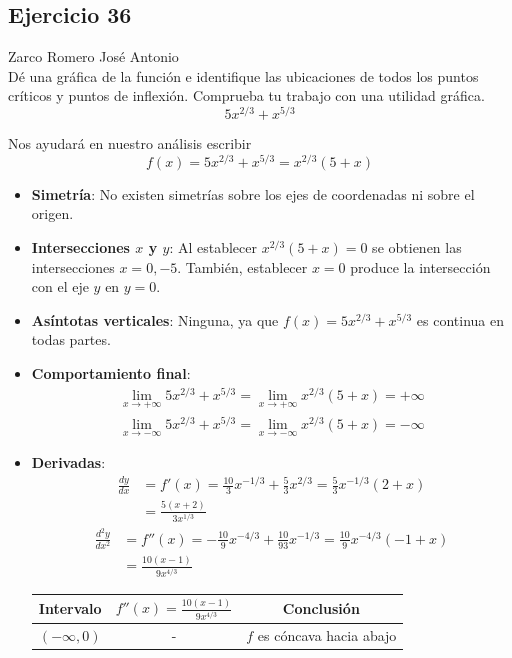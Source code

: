 \documentclass[12pt]{article}
\begin{document}
\subsection{Ejercicio 36} Zarco Romero José Antonio \\

Dé una gráfica de la función e identifique las ubicaciones de todos los puntos críticos y puntos de inflexión. Comprueba tu trabajo con una utilidad gráfica.
\[
5x^{2/3}+x^{5/3}
\]

Nos ayudará en nuestro análisis escribir
\[f(x)=5x^{2/3}+x^{5/3}=x^{2/3}(5+x)\]
\begin{itemize}
\item \textbf{Simetría}: No existen simetrías sobre los ejes de coordenadas ni sobre el origen.
\item \textbf{Intersecciones $x$ y $y$}: Al establecer $x^{2/3}(5+x)=0$ se obtienen las intersecciones $x=0,-5$. También, establecer $x=0$ produce la intersección con el eje $y$ en $y=0$.
\item  \textbf{Asíntotas verticales}: Ninguna, ya que $f(x) = 5x^{2/3}+x^{5/3}$ es continua en todas partes.
\item  \textbf{Comportamiento final}: 
  \begin{align*}
    \lim_{x \to +\infty}5x^{2/3}+x^{5/3} = \lim_{x \to +\infty} x^{2/3}(5+x) = +\infty \\
    \lim_{x \to -\infty} 5x^{2/3}+x^{5/3} = \lim_{x \to -\infty}  x^{2/3}(5+x) = -\infty 
  \end{align*}
\item \textbf{Derivadas}:
  \begin{align*}
    \frac{dy}{dx}
    &= f'(x) = \frac{10}{3}x^{-1/3} + \frac{5}{3}x^{2/3} = \frac{5}{3}x^{-1/3}(2+x)\\
    &= \frac{5(x+2)}{3x^{1/3}} 
  \end{align*}
  \begin{align*}
    \frac{d^2y}{dx^2}
    &= f''(x) = -\frac{10}{9}x^{-4/3} + \frac{10}{93}x^{-1/3} = \frac{10}{9}x^{-4/3}(-1+x) \\
    &= \frac{10(x-1)}{9x^{4/3}}
  \end{align*}
    \begin{table}[H]
    \centering
    \begin{tabular}{c|c|c}
      \hline
      Intervalo & $f''(x) = \frac{10(x-1)}{9x^{4/3}}$ & Conclusión \\
      \hline
      $(-\infty,0)$ & - & $f$ es cóncava hacia abajo \\

\end{tabular}
\end{table}
\end{itemize}
\end{document}
